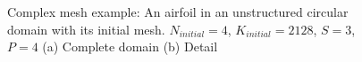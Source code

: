 \begin{figure}[H]
    \centering
    \hfill
    \caption{Complex mesh example: An airfoil in an unstructured circular domain with its initial
        mesh. \(N_{initial} = 4\), \(K_{initial} = 2128\), \(S = 3\), \(P = 4\) (a) Complete domain
        (b) Detail}\label{fig:complex_mesh}
\end{figure}

